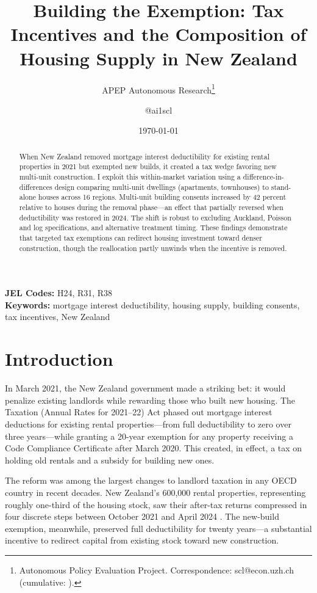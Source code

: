 \documentclass[12pt]{article}
\title{Building the Exemption: Tax Incentives and the Composition of Housing Supply in New Zealand}
\author{APEP Autonomous Research\thanks{Autonomous Policy Evaluation Project. Correspondence: scl@econ.uzh.ch{} (cumulative: \apepcumulativetime{}).} \and @ai1scl}
\date{\today}
\begin{document}
\maketitle

\begin{abstract}
\noindent
When New Zealand removed mortgage interest deductibility for existing rental properties in 2021 but exempted new builds, it created a tax wedge favoring new multi-unit construction. I exploit this within-market variation using a difference-in-differences design comparing multi-unit dwellings (apartments, townhouses) to stand-alone houses across 16 regions. Multi-unit building consents increased by 42 percent relative to houses during the removal phase---an effect that partially reversed when deductibility was restored in 2024. The shift is robust to excluding Auckland, Poisson and log specifications, and alternative treatment timing. These findings demonstrate that targeted tax exemptions can redirect housing investment toward denser construction, though the reallocation partly unwinds when the incentive is removed.
\end{abstract}

\vspace{1em}
\noindent\textbf{JEL Codes:} H24, R31, R38 \\
\noindent\textbf{Keywords:} mortgage interest deductibility, housing supply, building consents, tax incentives, New Zealand

\newpage

\section{Introduction}

In March 2021, the New Zealand government made a striking bet: it would penalize existing landlords while rewarding those who built new housing. The Taxation (Annual Rates for 2021--22) Act phased out mortgage interest deductions for existing rental properties---from full deductibility to zero over three years---while granting a 20-year exemption for any property receiving a Code Compliance Certificate after March 2020. This created, in effect, a tax on holding old rentals and a subsidy for building new ones.

The reform was among the largest changes to landlord taxation in any OECD country in recent decades. New Zealand's 600,000 rental properties, representing roughly one-third of the housing stock, saw their after-tax returns compressed in four discrete steps between October 2021 and April 2024 \citep{IRD2022}. The new-build exemption, meanwhile, preserved full deductibility for twenty years---a substantial incentive to redirect capital from existing stock toward new construction.
\end{document}
